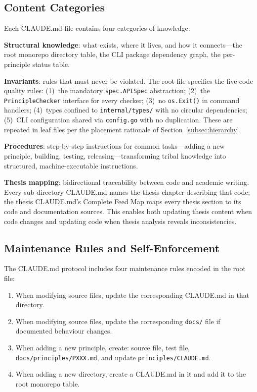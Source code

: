 \subsection{Content Categories}
\label{subsec:content-categories}

Each CLAUDE.md file contains four categories of knowledge:

\textbf{Structural knowledge}: what exists, where it lives, and how it connects---the root monorepo directory table, the CLI package dependency graph, the per-principle status table.

\textbf{Invariants}: rules that must never be violated. The root file specifies the five code quality rules: (1)~the mandatory \texttt{spec.APISpec} abstraction; (2)~the \texttt{PrincipleChecker} interface for every checker; (3)~no \texttt{os.Exit()} in command handlers; (4)~types confined to \texttt{internal/types/} with no circular dependencies; (5)~CLI configuration shared via \texttt{config.go} with no duplication. These are repeated in leaf files per the placement rationale of Section~\ref{subsec:hierarchy}.

\textbf{Procedures}: step-by-step instructions for common tasks---adding a new principle, building, testing, releasing---transforming tribal knowledge into structured, machine-executable instructions.

\textbf{Thesis mapping}: bidirectional traceability between code and academic writing. Every sub-directory CLAUDE.md names the thesis chapter describing that code; the thesis CLAUDE.md's Complete Feed Map maps every thesis section to its code and documentation sources. This enables both updating thesis content when code changes and updating code when thesis analysis reveals inconsistencies.

\subsection{Maintenance Rules and Self-Enforcement}
\label{subsec:maintenance-rules}

The CLAUDE.md protocol includes four maintenance rules encoded in the root file:

\begin{enumerate}
    \item When modifying source files, update the corresponding CLAUDE.md in that directory.
    \item When modifying source files, update the corresponding \texttt{docs/} file if documented behaviour changes.
    \item When adding a new principle, create: source file, test file, \texttt{docs/principles/PXXX.md}, and update \texttt{principles/CLAUDE.md}.
    \item When adding a new directory, create a CLAUDE.md in it and add it to the root monorepo table.
\end{enumerate}

